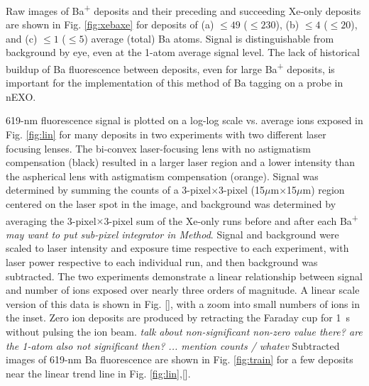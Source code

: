Raw images of Ba\textsuperscript{+} deposits and their preceding and succeeding Xe-only deposits are shown in Fig. \ref{fig:xebaxe} for deposits of (a) $\leq 49$ ($\leq 230$), (b) $\leq 4$ ($\leq 20$), and (c) $\leq 1$ ($\leq 5$) average (total) Ba atoms.   Signal is distinguishable from background by eye, even at the 1-atom average signal level.  The lack of historical buildup of Ba fluorescence between deposits, even for large Ba\textsuperscript{+} deposits, is important for the implementation of this method of Ba tagging on a probe in nEXO.


619-nm fluorescence signal is plotted on a log-log scale vs. average ions exposed in Fig. \ref{fig:lin} for many deposits in two experiments with two different laser focusing lenses.  The bi-convex laser-focusing lens with no astigmatism compensation (black) resulted in a larger laser region and a lower intensity than the aspherical lens with astigmatism compensation (orange).  Signal was determined by summing the counts of a 3-pixel$\times$3-pixel (15$\mu$m$\times$15$\mu$m) region centered on the laser spot in the image, and background was determined by averaging the 3-pixel$\times$3-pixel sum of the Xe-only runs before and after each Ba\textsuperscript{+} \emph{\color{gray}may want to put sub-pixel integrator in Method}.  Signal and background were scaled to laser intensity and exposure time respective to each experiment, with laser power respective to each individual run, and then background was subtracted.  The two experiments demonstrate a linear relationship between signal and number of ions exposed over nearly three orders of magnitude.  A linear scale version of this data is shown in Fig. [], with a zoom into small numbers of ions in the inset.  Zero ion deposits are produced by retracting the Faraday cup for 1~s without pulsing the ion beam.  \emph{\color{gray}talk about non-significant non-zero value there?  are the 1-atom also not significant then? ... mention counts / whatev}  Subtracted images of 619-nm Ba fluorescence are shown in Fig. \ref{fig:train} for a few deposits near the linear trend line in Fig. \ref{fig:lin},[].

